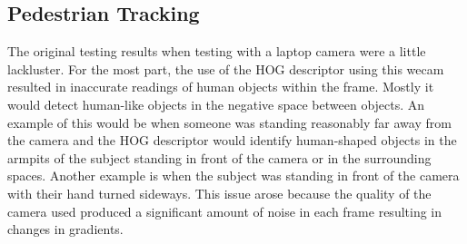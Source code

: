 \subsection{Pedestrian Tracking}
The original testing results when testing with a laptop camera were a little lackluster. For the most part, the use of the HOG descriptor using this wecam resulted in inaccurate readings of human objects within the frame. Mostly it would detect human-like objects in the negative space between objects. An example of this would be when someone was standing reasonably far away from the camera and the HOG descriptor would identify human-shaped objects in the armpits of the subject standing in front of the camera or in the surrounding spaces. Another example is when the subject was standing in front of the camera with their hand turned sideways. This issue arose because the quality of the camera used produced a significant amount of noise in each frame resulting in changes in gradients.\\



